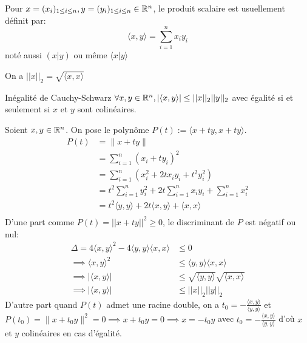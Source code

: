\documentclass[a4paper, 12pt]{article}
\begin{document}
\begin{definition}
    Pour $x = (x_i)_{1\leq i \leq n}, y = (y_i)_{1\leq i \leq n} \in \mathbb{R}^n$, le produit scalaire est usuellement définit par:
    $$
    \langle x, y \rangle = \sum_{i=1}^n x_i y_i
    $$
    noté aussi $(x | y)$ ou même $\langle x | y \rangle$
\end{definition}

\begin{remarque}
    On a $||x||_2 = \sqrt{\langle x, x \rangle}$
\end{remarque}

\begin{lemme}{Inégalité de Cauchy-Schwarz}{}
    $\forall x, y \in \mathbb{R}^n, |\langle x, y \rangle| \leq ||x||_2 ||y||_2$
    avec égalité si et seulement si $x$ et $y$ sont colinéaires.
\end{lemme}

\begin{demonstration}
    Soient $x, y \in \mathbb{R}^n$.\n
    On pose le polynôme $P(t) := \langle x + ty, x + ty \rangle$.
    \begin{align*}
        P(t) &= \|x+ty\|\\
        &= \sum_{i=1}^n (x_i + ty_i)^2\\
        &= \sum_{i=1}^n (x_i^2 + 2tx_iy_i + t^2y_i^2)\\
        &= t^2 \sum_{i=1}^n y_i^2 + 2t \sum_{i=1}^n x_iy_i + \sum_{i=1}^n x_i^2\\
        &= t^2 \langle y, y \rangle + 2t \langle x, y \rangle + \langle x, x \rangle\\
    \end{align*}
    D'une part comme $P(t) = ||x + ty||^2 \geq 0$, le discriminant de $P$ est négatif ou nul:
    \begin{align*}
        \Delta = 4\langle x, y \rangle^2 - 4\langle y, y \rangle \langle x, x \rangle &\leq 0\\
        \implies \langle x, y \rangle^2 &\leq \langle y, y \rangle \langle x, x \rangle\\
        \implies |\langle x, y \rangle| &\leq \sqrt{\langle y, y \rangle} \sqrt{\langle x, x \rangle}\\
        \implies |\langle x, y \rangle| &\leq ||x||_2 ||y||_2
    \end{align*}
    D'autre part quand $P(t)$ admet une racine double, on a $t_0 = -\frac{\langle x, y \rangle}{\langle y, y \rangle}$ et $P(t_0) = \|x + t_0y\|^2 = 0 \implies x + t_0y = 0 \implies x = -t_0y$
    avec $t_0 = -\frac{\langle x, y \rangle}{\langle y, y \rangle}$ d'où $x$ et $y$ colinéaires en cas d'égalité.
\end{demonstration}
\end{document}
